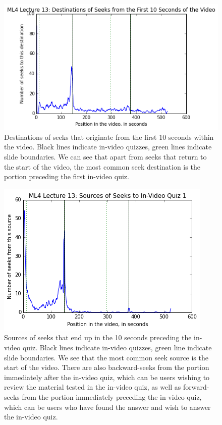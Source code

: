 \documentclass[letterpaper]{article}
\begin{document}
\begin{figure}
\includegraphics[width=1.0\columnwidth]{seekdest0}
\caption{Destinations of seeks that originate from the first 10 seconds within the video. Black lines indicate in-video quizzes, green lines indicate slide boundaries. We can see that apart from seeks that return to the start of the video, the most common seek destination is the portion preceding the first in-video quiz.}
\label{fig:seekdest0}
\end{figure}

\begin{figure}
\includegraphics[width=1.0\columnwidth]{seeksrc1}
\caption{Sources of seeks that end up in the 10 seconds preceding the in-video quiz. Black lines indicate in-video quizzes, green line indicate slide boundaries. We see that the most common seek source is the start of the video. There are also backward-seeks from the portion immediately after the in-video quiz, which can be users wishing to review the material tested in the in-video quiz, as well as forward-seeks from the portion immediately preceding the in-video quiz, which can be users who have found the answer and wish to answer the in-video quiz.}
\label{fig:seeksrc1}
\end{figure}
\end{document}
